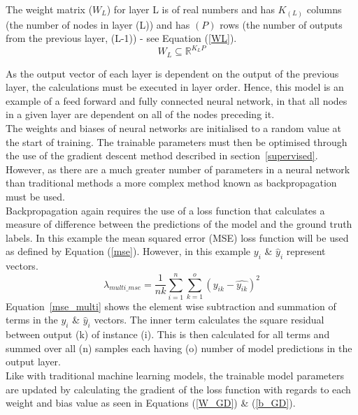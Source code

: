 \noindent
The weight matrix ($W_{L}$) for layer {L} is of real numbers and has $K_{(L)}$ columns (the number of nodes in layer (L)) and has $(P)$ rows (the number of outputs from the previous layer, (L-1)) - see Equation (\ref{WL}).
\\ 

\begin{equation} \label{WL}
	W_L \subseteq \mathbb{R}^{K_L P}
\end{equation}

\noindent
As the output vector of each layer is dependent on the output of the previous layer, the calculations must be executed in layer order. Hence, this model is an example of a feed forward and fully connected neural network, in that all nodes in a given layer are dependent on all of the nodes preceding it. \\

\noindent
The weights and biases of neural networks are initialised to a random value at the start of training. The trainable parameters must then be optimised through the use of the gradient descent method described in section~\ref{supervised}. However, as there are a much greater number of parameters in a neural network than traditional methods a more complex method known as backpropagation \cite{hecht1992theory} must be used. \\

\noindent
Backpropagation again requires the use of a loss function that calculates a measure of difference between the predictions of the model and the ground truth labels. In this example the mean squared error (MSE) loss function will be used as defined by Equation (\ref{mse}). However, in this example $y_i$ \& $\hat{y}_i$ represent vectors. \\

\begin{equation} \label{mse_multi}
	\lambda_{multi\_mse} = \frac{1}{nk}\sum_{i=1}^n \sum_{k=1}^o (y_{ik} - \hat{y_{ik}})^2
\end{equation}
%
\noindent
Equation~\ref{mse_multi} shows the element wise subtraction and summation of terms in the $y_i$ \& $\hat{y}_i$ vectors. The inner term calculates the square residual between output (k) of instance (i). This is then calculated for all terms and summed over all (n) samples each having (o) number of model predictions in the output layer. \\  

\noindent
Like with traditional machine learning models, the trainable model parameters are updated by calculating the gradient of the loss function with regards to each weight and bias value as seen in Equations (\ref{W_GD}) \& (\ref{b_GD}). \\

